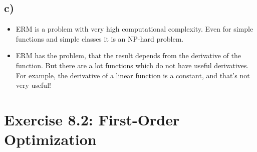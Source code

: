 \documentclass[a4paper]{article}
\begin{document}
    
    \subsection*{c)}
        \begin{itemize}
            \item ERM is a problem with very high computational complexity.
            Even for simple functions and simple classes it is an NP-hard problem.
            \item ERM has the problem, that the result depends from the derivative of the function.
            But there are a lot functions which do not have useful derivatives.
            For example, the derivative of a linear function is a constant, and that's not very useful!
        \end{itemize}




\newpage
\section*{Exercise 8.2: First-Order Optimization}
\end{document}

